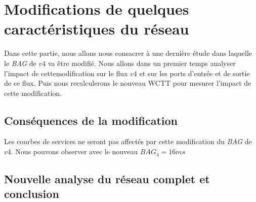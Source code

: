 \chapter{Modifications de quelques caractéristiques du réseau}
Dans cette partie, nous allons nous consacrer à une dernière étude dans laquelle le \emph{BAG} de $v4$ va être modifié. Nous allons dans un premier temps analyser l'impact de cettemodification sur le flux $v4$ et sur les ports d'entrée et de sortie de ce flux. Puis nous recalculerons le nouveau WCTT pour mesurer l'impact de cette modification.

\section{Conséquences de la modification}
Les courbes de services ne seront pas affectés par cette modification du \emph{BAG} de $v4$. Nous pouvons observer avec le nouveau $BAG_4 = 16ms$  

\section{Nouvelle analyse du réseau complet et conclusion} 